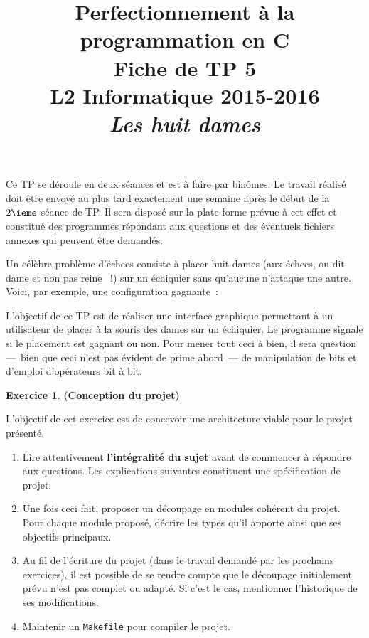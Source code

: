 \documentclass[11pt]{article}
\date{}
\title{{\bf Perfectionnement à la programmation en {\sf C}} \\
    Fiche de TP 5 \\
    {\small L2 Informatique 2015-2016} \\
    {\it \small Les huit dames}}
\theoremstyle{definition}
\newtheorem{Exercice}{Exercice}
\begin{document}
\maketitle

Ce TP se déroule en deux séances et est à faire par binômes. Le travail
réalisé doit être envoyé au plus tard exactement une semaine après le
début de la $2\ieme$ séance de TP. Il sera disposé sur la plate-forme
prévue à cet effet et constitué des programmes répondant aux questions
et des éventuels fichiers annexes qui peuvent être demandés.
\bigskip
\bigskip
\bigskip

Un célèbre problème d'échecs consiste à placer huit dames
(aux échecs, on dit \og dame \fg{} et non pas \og reine \fg{}~!) sur un
échiquier sans qu'aucune n'attaque une autre. Voici, par exemple, une
configuration gagnante~:
\begin{center}\showboard\end{center}
\bigskip

L'objectif de ce TP est de réaliser une interface graphique permettant
à un utilisateur de placer à la souris des dames sur un échiquier. Le
programme signale si le placement est gagnant ou non. Pour mener tout
ceci à bien, il sera question ---~bien que ceci n'est pas évident de
prime abord~--- de manipulation de bits et d'emploi d'opérateurs bit à
bit.
\bigskip
\bigskip
\bigskip

\begin{Exercice} {\bf (Conception du projet)}\smallskip

L'objectif de cet exercice est de concevoir une architecture viable pour
le projet présenté.
\smallskip

\begin{enumerate}
    \item Lire attentivement {\bf l'intégralité du sujet} avant de
    commencer à répondre aux questions. Les explications suivantes
    constituent une spécification de projet.
    \smallskip

    \item Une fois ceci fait, proposer un découpage en modules cohérent
    du projet. Pour chaque module proposé, décrire les types qu'il apporte
    ainsi que ses objectifs principaux.
    \smallskip

    \item Au fil de l'écriture du projet (dans le travail demandé par les
    prochains exercices), il est possible de se rendre compte que le
    découpage initialement prévu n'est pas complet ou adapté. Si c'est
    le cas, mentionner l'historique de ses modifications.
    \smallskip

    \item Maintenir un {\tt Makefile} pour compiler le projet.
\end{enumerate}
\end{Exercice}
\bigskip
\end{document}
